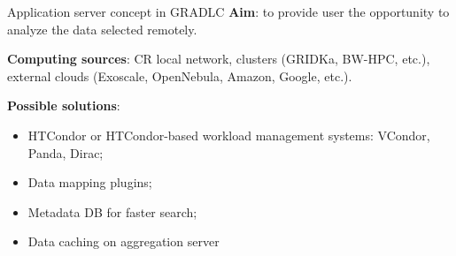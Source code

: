 
\begin{frame}{Application server concept in GRADLC}
\textbf{Aim}: to provide user the opportunity to analyze the data selected remotely.

\textbf{Computing sources}: CR local network, clusters (GRIDKa, BW-HPC, etc.), external clouds (Exoscale, OpenNebula, Amazon, Google, etc.).

\textbf{Possible solutions}: 
  \begin{itemize}
    \item HTCondor or HTCondor-based workload management systems: VCondor, Panda, Dirac;
    \item Data mapping plugins;
    \item Metadata DB for faster search;
    \item Data caching on aggregation server
  \end{itemize}

\end{frame}



